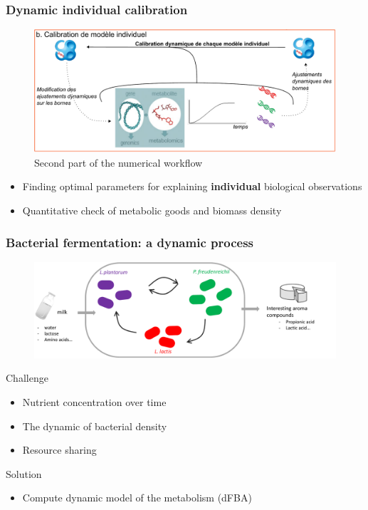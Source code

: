 \documentclass[8pt,usenames,dvipsnames]{beamer}
\begin{document}
\begin{frame}
\frametitle{Dynamic individual calibration}
\begin{figure}
\includegraphics[width=\textwidth]{figures/calibration.pdf}
\caption{Second part of the numerical workflow}
\end{figure}

\begin{block}{}
\begin{itemize}
\item Finding optimal parameters for explaining \textbf{individual} biological observations
\item Quantitative check of metabolic goods and biomass density
\end{itemize}
\end{block}

\end{frame}


\begin{frame}
\frametitle{Bacterial fermentation: a dynamic process}

\begin{adjustwidth}{-0.8cm}{}
\begin{figure}
\includegraphics[width=1.15\textwidth]{figures/tango}
\end{figure}
\end{adjustwidth}

\begin{block}{Challenge}
\begin{itemize}
\item Nutrient concentration over time
\item The dynamic of bacterial density
\item Resource sharing 
\end{itemize}
\end{block}

\begin{block}{Solution}
\begin{itemize}
\item Compute dynamic model of the metabolism (dFBA) \tiny \citep{Mahadevan.2002}
\end{itemize}
\end{block}

\end{frame}
\end{document}
